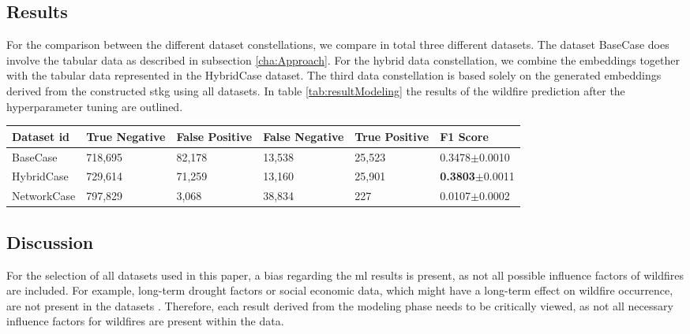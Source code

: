 \documentclass[
]{ceurart}
\begin{document}
\subsection{Results}\label{cha:Results}
For the comparison between the different dataset constellations, we compare in total three different datasets. The dataset BaseCase does involve the tabular data as described in subsection \ref{cha:Approach}. For the hybrid data constellation, we combine the embeddings together with the tabular data represented in the HybridCase dataset. The third data constellation is based solely on the generated embeddings derived from the constructed \gls*{stkg} using all datasets. In table \ref{tab:resultModeling} the results of the wildfire prediction after the hyperparameter tuning are outlined.
\begin{table*}[ht]
	\caption{Model results after hyperparameter tuning, the highest F1 score is marked bold}
	\label{tab:resultModeling}
	\begin{tabular}{p{}p{}p{}p{}p{}p{}}
		\toprule
		Dataset \gls*{id} & True Negative & False Positive & False Negative & True \linebreak Positive & F1 Score                   \\
		\midrule
		BaseCase          & 718,695       & 82,178         & 13,538         & 25,523                   & 0.3478$\pm$0.0010          \\
		HybridCase        & 729,614       & 71,259         & 13,160         & 25,901                   & \textbf{0.3803}$\pm$0.0011 \\
		NetworkCase       & 797,829       & 3,068          & 38,834         & 227                      & 0.0107$\pm$0.0002          \\
		\bottomrule
	\end{tabular}
\end{table*}


\subsection{Discussion} \label{cha:Discussion}
For the selection of all datasets used in this paper, a bias regarding the \gls*{ml} results is present, as not all possible influence factors of wildfires are included. For example, long-term drought factors or social economic data, which might have a long-term effect on wildfire occurrence, are not present in the datasets \cite{Littell.2018}. Therefore, each result derived from the modeling phase needs to be critically viewed, as not all necessary influence factors for wildfires are present within the data.
\end{document}
